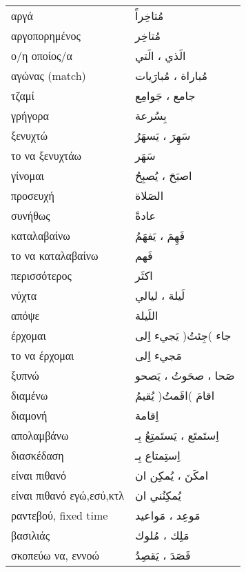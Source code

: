 \documentclass[twocolumn,a4paper]{article}
\newcommand{\ar}[1]{\textarabic{#1}}
\newcommand{\prth}[1]{\textenglish{)}#1\textenglish{(}}
\newcommand{\pl}{\raisebox{0.15ex}{\footnotesize ◍}}
\newcommand{\vrf}{\raisebox{0.15ex}{\footnotesize ◉}}
\newcommand{\mas}{\raisebox{0.15ex}{\footnotesize ◫}}
\begin{document}
\begin{mpsupertabular}{ P{0.5\textwidth} P{0.5\textwidth} }
αργά                         & \ar{ مُتاخِراً } \\
αργοπορημένος                & \ar{ مُتاخِر } \\
ο/η οποίος/α                 & \ar{ الَذي ، الَتي } \\
αγώνας (match) \pl           & \ar{ مُباراة ، مُبارَيات } \\
τζαμί \pl                    & \ar{ جامع ، جَوامِع } \\
γρήγορα                      & \ar{ بِسُرعة } \\
ξενυχτώ \vrf                 & \ar{ سَهِرَ ، يَسهَرُ } \\
το να ξενυχτάω \mas          & \ar{ سَهَر } \\
γίνομαι \vrf                 & \ar{ اصبَحَ ، يُصبِحُ } \\
προσευχή                     & \ar{ الصَلاة } \\
συνήθως                      & \ar{ عادةً } \\
καταλαβαίνω \vrf             & \ar{ فَهِمَ ، يَفهَمُ } \\
το να καταλαβαίνω \mas       & \ar{ فَهم } \\
περισσότερος                 & \ar{ اكثَر } \\
νύχτα \pl                    & \ar{ لَيلة ، ليالي } \\
απόψε                        & \ar{ اللَيلة } \\
έρχομαι \vrf                 & \ar{ جاء \prth{جِئتُ} يَجيء اِلى } \\
το να έρχομαι \mas           & \ar{ مَجيء اِلى } \\
ξυπνώ \vrf                   & \ar{ صَحا ، صحَوتُ ، يَصحو } \\
διαμένω \vrf                 & \ar{ اقامَ \prth{اقَمتُ} يُقيمُ } \\
διαμονή \mas                 & \ar{ اِقامة } \\
απολαμβάνω \vrf              & \ar{ اِستَمتَع ، يَستَمتِعُ بِـ } \\
διασκέδαση \mas              & \ar{ اِستِمتاع بِـ } \\
είναι πιθανό \vrf            & \ar{ امكَنَ ، يُمكِن ان } \\
είναι πιθανό εγώ,εσύ,κτλ     & \ar{ يُمكِنُني ان } \\
ραντεβού, fixed time \pl     & \ar{ مَوعِد ، مَواعيد } \\
βασιλιάς \pl                 & \ar{ مَلِك ، مُلوك } \\
σκοπεύω να, εννοώ \vrf       & \ar{ قَصَدَ ، يَقصِدُ } \\

\end{mpsupertabular}
\end{document}
